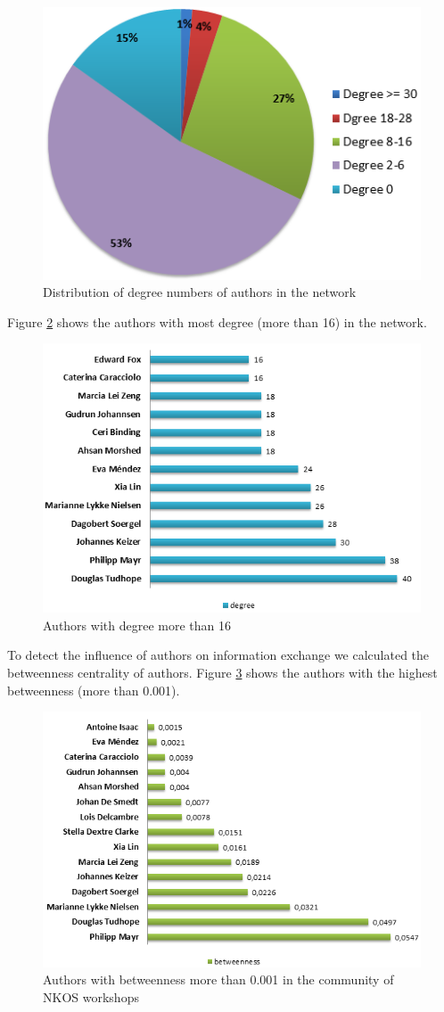 \documentclass[runningheads,a4paper]{llncs}
\begin{document}
\begin{figure}[H]
	\centering
	\includegraphics[width=0.7\linewidth]{degreePercentage}
	\caption{Distribution of degree numbers of authors in the network} 
	\label{fig:degreePercentage}
\end{figure}

Figure \ref{fig:degree16} shows the authors with most degree (more than 16) in the network. 

\begin{figure}[H]
	\centering
	\includegraphics[width=0.7\linewidth]{degree16}
	\caption{Authors with degree more than 16}
	\label{fig:degree16}
\end{figure}

To detect the influence of authors on information exchange we calculated the betweenness centrality of authors. Figure \ref{fig:betweenness} shows the authors with the highest betweenness (more than 0.001).

\begin{figure}
\centering
\includegraphics[width=0.7\linewidth]{betweenness}
\caption{Authors with betweenness more than 0.001 in the community of NKOS workshops}
\label{fig:betweenness}
\end{figure}
\end{document}
